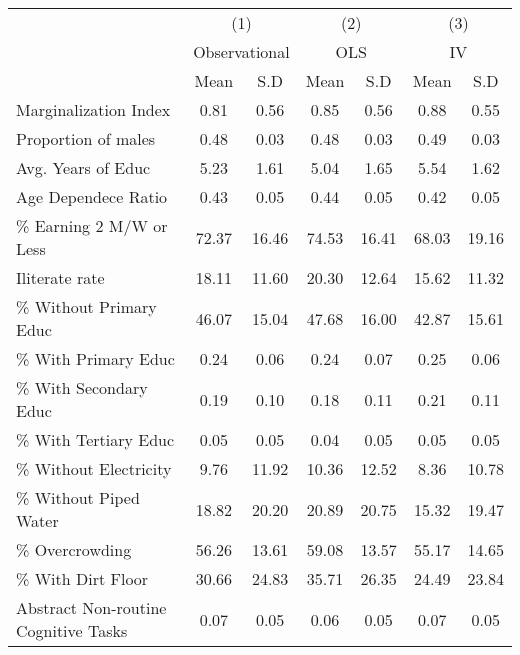 {
\def\sym#1{\ifmmode^{#1}\else\(^{#1}\)\fi}
\begin{tabular}{l*{3}{cc}}
\hline\hline
                    &\multicolumn{2}{c}{(1)}  &\multicolumn{2}{c}{(2)}  &\multicolumn{2}{c}{(3)}  \\
                    &\multicolumn{2}{c}{Observational}&\multicolumn{2}{c}{OLS}  &\multicolumn{2}{c}{IV}   \\
                    &        Mean&         S.D&        Mean&         S.D&        Mean&         S.D\\
\hline
Marginalization Index&        0.81&        0.56&        0.85&        0.56&        0.88&        0.55\\
Proportion of males &        0.48&        0.03&        0.48&        0.03&        0.49&        0.03\\
Avg. Years of Educ  &        5.23&        1.61&        5.04&        1.65&        5.54&        1.62\\
Age Dependece Ratio &        0.43&        0.05&        0.44&        0.05&        0.42&        0.05\\
\% Earning 2 M/W or Less&       72.37&       16.46&       74.53&       16.41&       68.03&       19.16\\
Iliterate rate      &       18.11&       11.60&       20.30&       12.64&       15.62&       11.32\\
\% Without Primary Educ&       46.07&       15.04&       47.68&       16.00&       42.87&       15.61\\
\% With Primary Educ&        0.24&        0.06&        0.24&        0.07&        0.25&        0.06\\
\% With Secondary Educ&        0.19&        0.10&        0.18&        0.11&        0.21&        0.11\\
\% With Tertiary Educ&        0.05&        0.05&        0.04&        0.05&        0.05&        0.05\\
\% Without Electricity&        9.76&       11.92&       10.36&       12.52&        8.36&       10.78\\
\% Without Piped Water&       18.82&       20.20&       20.89&       20.75&       15.32&       19.47\\
\% Overcrowding     &       56.26&       13.61&       59.08&       13.57&       55.17&       14.65\\
\% With Dirt Floor  &       30.66&       24.83&       35.71&       26.35&       24.49&       23.84\\
Abstract Non-routine Cognitive Tasks&        0.07&        0.05&        0.06&        0.05&        0.07&        0.05\\

\end{tabular}}
